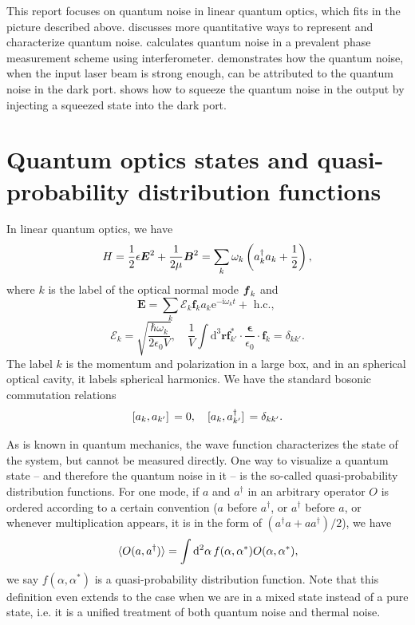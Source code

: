 \documentclass[hyperref, a4paper]{article}
\begin{document}
This report focuses on quantum noise in linear quantum optics,
which fits in the picture described above.
 discusses more quantitative ways to represent and characterize quantum noise.
 calculates quantum noise 
in a prevalent phase measurement scheme using interferometer.
 demonstrates how the quantum noise, 
when the input laser beam is strong enough,
can be attributed to the quantum noise in the dark port.
 shows how to squeeze the quantum noise in the output 
by injecting a squeezed state into the dark port.

\section{Quantum optics states and quasi-probability distribution functions}\label{sec:overview-rep}

In linear quantum optics, we have \cite{steck2007quantum} 
\begin{equation}
    H = \frac{1}{2} \epsilon \vb*{E}^2 + \frac{1}{2 \mu} \vb*{B}^2
    = \sum_{k} \omega_k \left( a^\dagger_k a_k + \frac{1}{2} \right),
\end{equation}
where $k$ is the label of the optical normal mode $\vb*{f}_k$ and 
\begin{equation}
    \boldsymbol{E}=\sum_k \mathcal{E}_k \boldsymbol{f}_k a_k \mathrm{e}^{-\mathrm{i} \omega_k t}+\text { h.c., } 
\end{equation}
\begin{equation}
    \mathcal{E}_k = \sqrt{\frac{\hbar \omega_k}{2 \epsilon_0 V}} , \quad \frac{1}{V} \int \mathrm{d}^3 \boldsymbol{r} \boldsymbol{f}_{k'}^* \cdot \frac{\boldsymbol{\epsilon}}{\epsilon_0} \cdot \boldsymbol{f}_k =\delta_{k k'} .
\end{equation}
The label $k$ is the momentum and polarization in a large box, 
and in an spherical optical cavity, it labels spherical harmonics.
We have the standard bosonic commutation relations 
\begin{equation}
    \comm*{a_k}{a_{k'}} = 0, \quad \comm*{a_k}{a^\dagger_{k'}} = \delta_{k k'}.
\end{equation}

As is known in quantum mechanics,
the wave function characterizes the state of the system,
but cannot be measured directly.
One way to visualize a quantum state -- and therefore the quantum noise in it --
is the so-called quasi-probability distribution functions.
For one mode, if $a$ and $a^\dagger$ in an arbitrary operator $O$ is ordered according to a certain convention
($a$ before $a^\dagger$, or $a^\dagger$ before $a$, 
or whenever multiplication appears, it is in the form of $(a^\dagger a + a a^\dagger) / 2$), 
we have 
\begin{equation}
    \expval*{O(a, a^\dagger)} = \int \dd[2]{\alpha} f(\alpha, \alpha^*) O(\alpha, \alpha^*),
\end{equation}
we say $f(\alpha, \alpha^*)$ is a quasi-probability distribution function.
Note that this definition even extends to the case 
when we are in a mixed state instead of a pure state, 
i.e. it is a unified treatment of both quantum noise and thermal noise.
\end{document}
